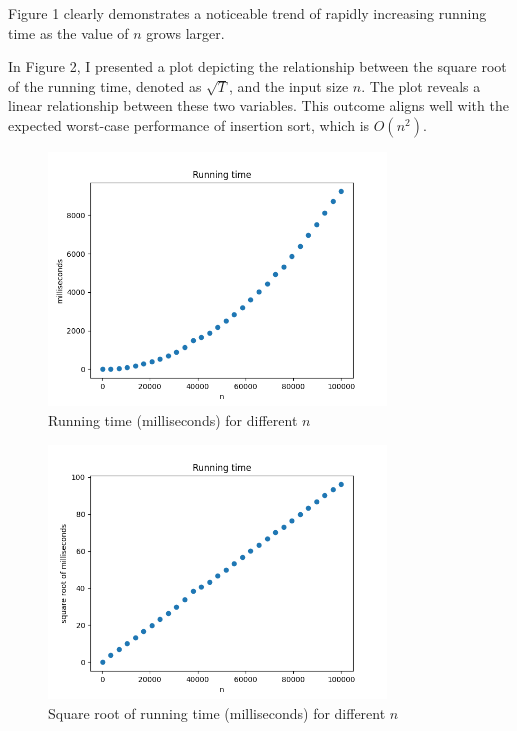 \documentclass[10pt]{article}
\begin{document}
Figure 1 clearly demonstrates a noticeable trend of rapidly increasing running time as the value of $n$ grows larger.

In Figure 2, I presented a plot depicting the relationship between the square root of the running time, denoted as $\sqrt{T}$, and the input size $n$. The plot reveals a linear relationship between these two variables. This outcome aligns well with the expected worst-case performance of insertion sort, which is $O(n^2)$.

\begin{figure}[H]
  \centering
  \includegraphics[width=0.8\textwidth]{../assets/runtime.png}
  \caption{Running time (milliseconds) for different $n$}
\end{figure}

\begin{figure}[H]
  \centering
  \includegraphics[width=0.8\textwidth]{../assets/squared_runtime.png}
  \caption{Square root of running time (milliseconds) for different $n$}
\end{figure}
\end{document}
